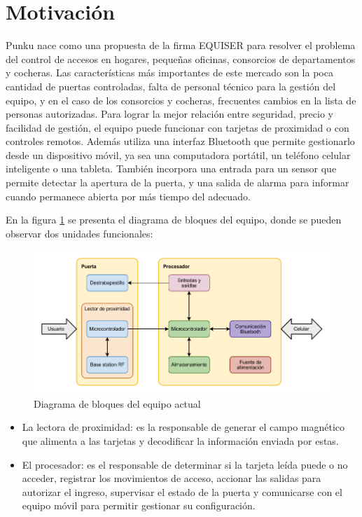 \section{Motivación}
\label{sec:motivacion}

Punku nace como una propuesta de la firma EQUISER para resolver el problema del control de accesos en hogares, pequeñas oficinas, consorcios de departamentos y cocheras. Las características más importantes de este mercado son la poca cantidad de puertas controladas, falta de personal técnico para la gestión del equipo, y en el caso de los consorcios y cocheras, frecuentes cambios en la lista de personas autorizadas. Para lograr la mejor relación entre seguridad, precio y facilidad de gestión, el equipo puede funcionar con tarjetas de proximidad o con controles remotos. Además utiliza una interfaz Bluetooth que permite gestionarlo desde un dispositivo móvil, ya sea una computadora portátil, un teléfono celular inteligente o una tableta. También incorpora una entrada para un sensor que permite detectar la apertura de la puerta, y una salida de alarma para informar cuando permanece abierta por más tiempo del adecuado. 

En la figura \ref{fig:BloquesActual} se presenta el diagrama de bloques del equipo, donde se pueden observar dos unidades funcionales:

\begin{figure}[ht]
	\centering
	\includegraphics[width=\textwidth]{./Figures/BloquesActual.pdf}
	\caption{Diagrama de bloques del equipo actual}
	\label{fig:BloquesActual}
\end{figure}

\begin{itemize}
	\item La lectora de proximidad: es la responsable de generar el campo magnético que alimenta a las tarjetas y decodificar la información enviada por estas.
	\item El procesador: es el responsable de determinar si la tarjeta leída puede o no acceder, registrar los movimientos de acceso, accionar las salidas para autorizar el ingreso, supervisar el estado de la puerta y comunicarse con el equipo móvil para permitir gestionar su configuración.
\end{itemize}

